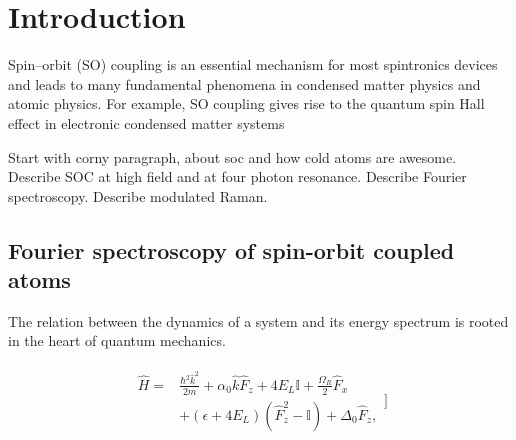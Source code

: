 \section{Introduction}




Spin–orbit (SO) coupling is an essential mechanism for most
spintronics devices and leads to many fundamental phenomena
in condensed matter physics and atomic physics. For example,
SO coupling gives rise to the quantum spin Hall effect in
electronic condensed matter systems

Start with corny paragraph, about soc and how cold atoms are awesome.
Describe SOC at high field and at four photon resonance. Describe Fourier spectroscopy. Describe modulated Raman. 



\subsection{Fourier spectroscopy of spin-orbit coupled atoms}		


The relation between the dynamics of a system and its energy spectrum is rooted in the heart of quantum mechanics.  


\begin{align}
\begin{split}
\hat{H} = &\frac{\hbar^2\hat{k}^2}{2m} + \alpha_0\hat{k}\hat{F}_z +4E_L\mathbb{I} + \frac{\Omega_R}{2}\hat{F}_x\\
& +(\epsilon+4E_L)(\hat{F}_z^2-\mathbb{I}) +\Delta_0\hat{F}_z, 
\label{Eq:SOCone}
\end{split}]
\end{align}	


